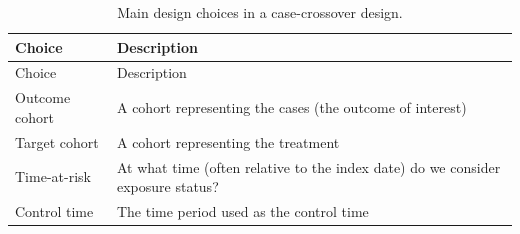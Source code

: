 \documentclass[11pt]{book}
\begin{document}
\begin{longtable}[]{@{}ll@{}}
\caption{\label{tab:ccrChoices} Main design choices in a case-crossover
design.}\tabularnewline
\toprule
\begin{minipage}[b]{0.23\columnwidth}\raggedright\strut
Choice\strut
\end{minipage} & \begin{minipage}[b]{0.71\columnwidth}\raggedright\strut
Description\strut
\end{minipage}\tabularnewline
\midrule
\endfirsthead
\toprule
\begin{minipage}[b]{0.23\columnwidth}\raggedright\strut
Choice\strut
\end{minipage} & \begin{minipage}[b]{0.71\columnwidth}\raggedright\strut
Description\strut
\end{minipage}\tabularnewline
\midrule
\endhead
\begin{minipage}[t]{0.23\columnwidth}\raggedright\strut
Outcome cohort\strut
\end{minipage} & \begin{minipage}[t]{0.71\columnwidth}\raggedright\strut
A cohort representing the cases (the outcome of interest)\strut
\end{minipage}\tabularnewline
\begin{minipage}[t]{0.23\columnwidth}\raggedright\strut
Target cohort\strut
\end{minipage} & \begin{minipage}[t]{0.71\columnwidth}\raggedright\strut
A cohort representing the treatment\strut
\end{minipage}\tabularnewline
\begin{minipage}[t]{0.23\columnwidth}\raggedright\strut
Time-at-risk\strut
\end{minipage} & \begin{minipage}[t]{0.71\columnwidth}\raggedright\strut
At what time (often relative to the index date) do we consider exposure
status?\strut
\end{minipage}\tabularnewline
\begin{minipage}[t]{0.23\columnwidth}\raggedright\strut
Control time\strut
\end{minipage} & \begin{minipage}[t]{0.71\columnwidth}\raggedright\strut
The time period used as the control time\strut
\end{minipage}\tabularnewline
\bottomrule
\end{longtable}
\end{document}
